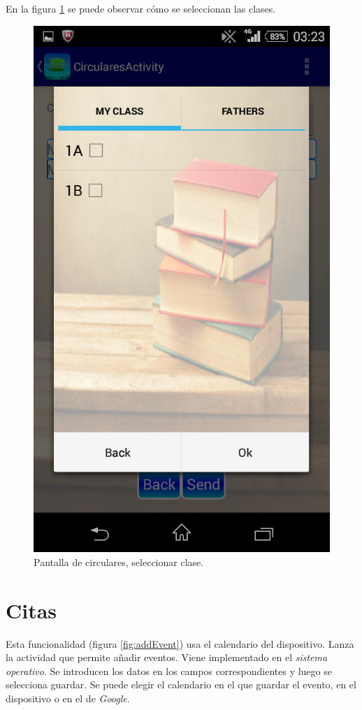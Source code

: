 		En la figura \ref{fig:selectClass} se puede observar cómo se seleccionan las clases.
		
		\begin{figure}[h !]
			\centering
			\includegraphics[scale=0.2]{Imagenes/App/selectClass}
			\caption{Pantalla de circulares, seleccionar clase.}
			\label{fig:selectClass}
		\end{figure}
	
	\section{Citas} \label{sec:dates}
		Esta funcionalidad (figura \ref{fig:addEvent}) usa el calendario del dispositivo. Lanza la actividad que permite añadir eventos. Viene implementado en el {\it sistema operativo}.
		Se introducen los datos en los campos correspondientes y luego se selecciona guardar. Se puede elegir el calendario en el que guardar el evento, en el dispositivo o en el de {\it Google}.
		
